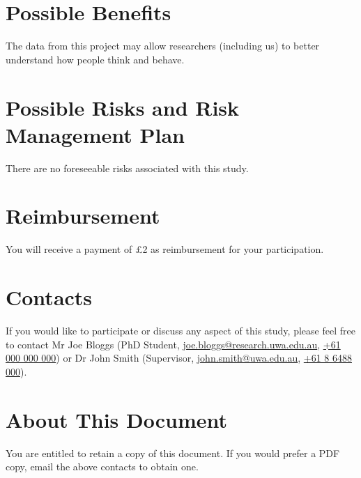 \documentclass{uwa-pif}
\begin{document}
\section{Possible Benefits}

The data from this project may allow researchers (including us) to better
understand how people think and behave.

\section{Possible Risks and Risk Management Plan}

There are no foreseeable risks associated with this study.

\section{Reimbursement}

You will receive a payment of £2 as reimbursement for your participation.

\section{Contacts}

If you would like to participate or discuss any aspect of this study,
please feel free to contact Mr Joe Bloggs (PhD Student,
\href{mailto:joe.bloggs@research.uwa.edu.au}{joe.bloggs@research.uwa.edu.au},
\href{tel:+61-000-000-000}{+61 000 000 000}) or Dr John Smith (Supervisor,
\href{mailto:john.smith@uwa.edu.au}{john.smith@uwa.edu.au},
\href{tel:+61-8-6488-000}{+61 8 6488 000}).

\section{About This Document}

You are entitled to retain a copy of this document. If you would prefer
a PDF copy, email the above contacts to obtain one.
\end{document}
